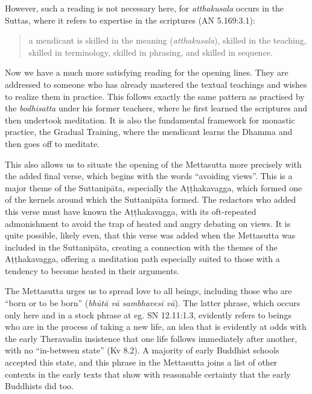\documentclass[12pt,openany]{book}%
\begin{document}
However, such a reading is not necessary here, for \textit{atthakusala} occurs in the Suttas, where it refers to expertise in the scriptures (AN 5.169:3.1):

\begin{quotation}%
a mendicant is skilled in the meaning (\textit{atthakusala}), skilled in the teaching, skilled in terminology, skilled in phrasing, and skilled in sequence.

%
\end{quotation}

Now we have a much more satisfying reading for the opening lines. They are addressed to someone who has already mastered the textual teachings and wishes to realize them in practice. This follows exactly the same pattern as practised by the \textit{bodhisatta} under his former teachers, where he first learned the scriptures and then undertook meditation. It is also the fundamental framework for monastic practice, the Gradual Training, where the mendicant learns the Dhamma and then goes off to meditate.

This also allows us to situate the opening of the Mettasutta more precisely with the added final verse, which begins with the words “avoiding views”. This is a major theme of the \textsanskrit{Suttanipāta}, especially the \textsanskrit{Aṭṭhakavagga}, which formed one of the kernels around which the \textsanskrit{Suttanipāta} formed. The redactors who added this verse must have known the \textsanskrit{Aṭṭhakavagga}, with its oft-repeated admonishment to avoid the trap of heated and angry debating on views. It is quite possible, likely even, that this verse was added when the Mettasutta was included in the \textsanskrit{Suttanipāta}, creating a connection with the themes of the \textsanskrit{Aṭṭhakavagga}, offering a meditation path especially suited to those with a tendency to become heated in their arguments.

The Mettasutta urges us to spread love to all beings, including those who are “born or to be born” (\textit{\textsanskrit{bhūtā} \textsanskrit{vā} \textsanskrit{sambhavesī} \textsanskrit{vā}}). The latter phrase, which occurs only here and in a stock phrase at eg. SN 12.11:1.3, evidently refers to beings who are in the process of taking a new life, an idea that is evidently at odds with the early Theravadin insistence that one life follows immediately after another, with no “in-between state” (Kv 8.2). A majority of early Buddhist schools accepted this state, and this phrase in the Mettasutta joins a list of other contexts in the early texts that show with reasonable certainty that the early Buddhists did too.
\end{document}
